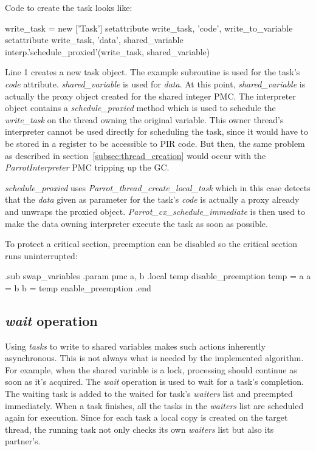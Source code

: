 \documentclass[bachelor,english]{hgbthesis}
\begin{document}
Code to create the task looks like:
%
\begin{GenericCode}
    write_task = new ['Task']
    setattribute write_task, 'code', write_to_variable
    setattribute write_task, 'data', shared_variable
    interp.'schedule_proxied'(write_task, shared_variable)
\end{GenericCode}
%
Line 1 creates a new task object. The example subroutine is used for the task's \textit{code} attribute. \textit{shared\_variable} is used for \textit{data}. At this point, \textit{shared\_\-variable} is actually the proxy object created for the shared integer PMC. The interpreter object contains a \textit{schedule\_proxied} method which is used to schedule the \textit{write\_task} on the thread owning the original variable. This owner thread's interpreter cannot be used directly for scheduling the task, since it would have to be stored in a register to be accessible to PIR code. But then, the same problem as described in section~\ref{subsec:thread_creation} would occur with the \textit{ParrotInterpreter} PMC tripping up the GC.

\textit{schedule\_proxied} uses \textit{Parrot\_thread\_create\_local\_task} which in this case detects that the \textit{data} given as parameter for the task's \textit{code} is actually a proxy already and unwraps the proxied object. \textit{Parrot\_cx\_schedule\_\-immediate} is then used to make the data owning interpreter execute the task as soon as possible.

To protect a critical section, preemption can be disabled so the critical section runs uninterrupted:
%
\begin{GenericCode}
.sub swap_variables
    .param pmc a, b
    .local temp
    disable_preemption
    temp = a
    a = b
    b = temp
    enable_preemption
.end
\end{GenericCode}

\subsection{\textit{wait} operation}

Using \textit{tasks} to write to shared variables makes such actions inherently asynchronous. This is not always what is needed by the implemented algorithm. For example, when the shared variable is a lock, processing should continue as soon as it's acquired. The \textit{wait} operation is used to wait for a task's completion. The waiting task is added to the waited for task's \textit{waiters} list and preempted immediately. When a task finishes, all the tasks in the \textit{waiters} list are scheduled again for execution. Since for each task a local copy is created on the target thread, the running task not only checks its own \textit{waiters} list but also its partner's.
\end{document}
